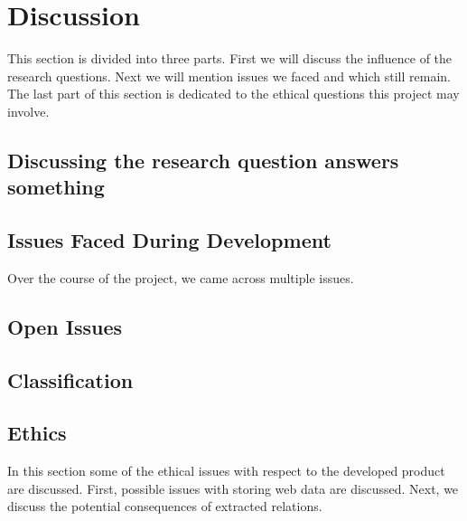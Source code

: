 \chapter{Discussion}

This section is divided into three parts. First we will discuss the influence of the research questions. Next we will mention issues we faced and which still remain. The last part of this section is dedicated to the ethical questions this project may involve.

\section{Discussing the research question answers something} 

\section{Issues Faced During Development}
Over the course of the project, we came across multiple issues. 
    


\section{Open Issues}\label{sec:Discussion - Open Issues}

\section{Classification}

\section{Ethics}
In this section some of the ethical issues with respect to the developed product are discussed. First, possible issues with storing web data are discussed. Next, we discuss the potential consequences of extracted relations.

